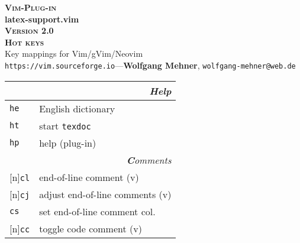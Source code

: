 \documentclass[oneside,10pt,landscape,DIV16]{scrartcl}
\newcommand{\Pluginversion}{2.0}
\newcommand{\Rep}{{\scriptsize{[n]}}}
\newcommand{\Map}[1] {\textbf{\textasciiacute}\texttt{#1}}
\begin{document}
\begin{multicols}{3}
\begin{center}
%
\textbf{\textsc{\small{Vim-Plug-in}}}\\
\textbf{\LARGE{latex-support.vim}}\\
\textbf{\textsc{\small{Version \Pluginversion}}}\\
\vspace{1mm}%
\textbf{\textsc{\Huge{Hot keys}}}\\
\vspace{1mm}%
Key mappings for Vim/gVim/Neovim\\
{\tiny  \texttt{https://vim.sourceforge.io}\hspace{1.5mm}---\hspace{1.5mm}\textbf{Wolfgang Mehner},  \texttt{wolfgang-mehner@web.de}}\\
\vspace{1.0mm}
%
\begin{tabular}[]{|p{11mm}|p{60mm}|}
\hline
\multicolumn{2}{|r|}{\textsl{\textbf{H}elp}}\\[1.0ex]
\hline \Map{he}   & English dictionary              \\
\hline \Map{ht}   & start \texttt{texdoc}           \\
\hline \Map{hp}   & help (plug-in)                  \\
\hline
\hline
\multicolumn{2}{|r|}{\textsl{\textbf{C}omments}}    \\[1.0ex]
\hline \Rep\Map{cl}   & end-of-line comment         \hfill (v)\\
\hline \Rep\Map{cj}   & adjust end-of-line comments \hfill (v)\\
\hline     \Map{cs}   & set end-of-line comment col.\\
%
\hline \Rep\Map{cc}   & toggle code comment         \hfill (v)\\

\end{tabular}
\end{center}
\end{multicols}
\end{document}
